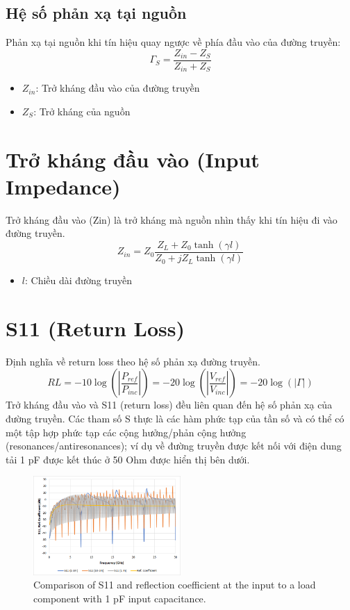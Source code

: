         \subsection{Hệ số phản xạ tại nguồn}
            Phản xạ tại nguồn khi tín hiệu quay ngược về phía đầu vào của đường truyền:
            $$\Gamma_S = \frac{Z_{in} - Z_S}{Z_{in} + Z_S}$$
            \begin{itemize}
                \item $Z_{in}$: Trở kháng đầu vào của đường truyền
                \item $Z_S$: Trở kháng của nguồn
            \end{itemize}

    \section{Trở kháng đầu vào (Input Impedance)}
        Trở kháng đầu vào (Zin) là trở kháng mà nguồn nhìn thấy khi tín hiệu đi vào đường truyền.
        \begin{equation}
            Z_{in} = Z_0 \frac{Z_L + Z_0 \tanh(\gamma l)}{Z_0 + jZ_L \tanh(\gamma l)}
            \label{eq:zin}    
        \end{equation}
        
        \begin{itemize}
            \item $l$: Chiều dài đường truyền
        \end{itemize}

    \section{S11 (Return Loss)}
        Định nghĩa về return loss theo hệ số phản xạ đường truyền.
        $$RL = -10\log\left(\left|\frac{P_{ref}}{P_{inc}}\right|\right) = -20\log\left(\left|\frac{V_{ref}}{V_{inc}}\right|\right) = -20\log\left(\left|\Gamma\right|\right)$$
        Trở kháng đầu vào và S11 (return loss) đều liên quan đến hệ số phản xạ của đường truyền. Các tham số S thực là các hàm phức tạp của tần số và có thể có một tập hợp phức tạp các cộng hưởng/phản cộng hưởng (resonances/antiresonances); ví dụ về đường truyền được kết nối với điện dung tải 1 pF được kết thúc ở 50 Ohm được hiển thị bên dưới.\par
        \begin{figure}[h]
            \centering
            \includegraphics[width=0.5\textwidth]{figures/1pf_input.png}
            \caption{Comparison of S11 and reflection coefficient at the input to a load component with 1 pF input capacitance.}
        \end{figure}

